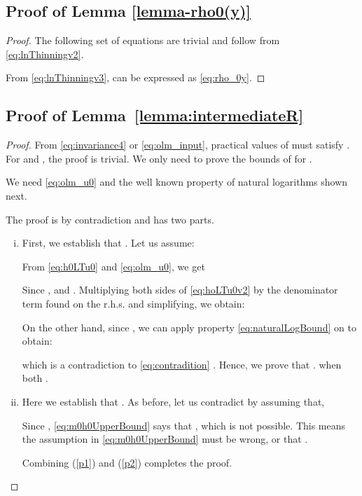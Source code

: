 \documentclass{IEEEtran}
\begin{document}
    \subsection*{Proof of Lemma \ref{lemma-rho0(y)}}
    \vspace{3mm}

    \begin{proof}
    The following set of equations are trivial and follow from \eqref{eq:lnThinningv2}.
    
    

From \eqref{eq:lnThinningv3},  can be expressed as \eqref{eq:rho_0y}.
\end{proof}






    \subsection*{Proof of Lemma~\ref{lemma:intermediateR}}
    \vspace{3mm}
     \begin{proof}
     From \eqref{eq:invariance4} or \eqref{eq:olm_input}, practical values of  must satisfy .  For  and , the proof is trivial. We only need to prove the bounds of  for .

     We need \eqref{eq:olm_u0} and the well known property of natural logarithms shown next.
     

     The proof is by contradiction and has two parts.
     \begin{enumerate}[(i)]
     \item \label{p1} First, we establish that . Let us assume:
     

    From \eqref{eq:h0LTu0} and \eqref{eq:olm_u0}, we get
    

    \newpage

     Since ,  and . Multiplying both sides of \eqref{eq:hoLTu0v2} by  the denominator term found on the r.h.s. and simplifying, we obtain:
     
     On the other hand, since , we can apply property \eqref{eq:naturalLogBound} on  to obtain:
     
     which is a contradiction to \eqref{eq:contradition} .
    Hence, we prove that .  when both .

     \item \label{p2} Here we establish that . As before, let us contradict by assuming that,
         

     Since , \eqref{eq:m0h0UpperBound} says that , which is not possible. This means the assumption in \eqref{eq:m0h0UpperBound} must be wrong, or that .

     Combining (\ref{p1}) and (\ref{p2}) completes the proof.
     \end{enumerate}
   \end{proof}
\end{document}
